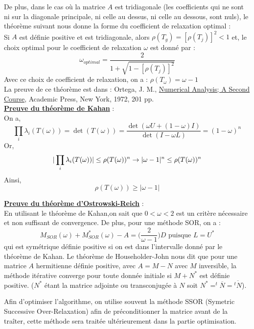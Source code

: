 De plus, dans le cas où la matrice $A$ est tridiagonale (les coefficients qui ne sont ni sur la diagonale principale, ni celle au dessus, ni celle au dessous, sont nuls), le théorème suivant nous donne la forme du coefficient de relaxation optimal :\\

Si $A$ est définie positive et est tridiagonale, alors $\rho(T_g)=[\rho(T_j)]^2<1$ et, le choix optimal pour le coefficient de relaxation $\omega$ est donné par : 
$$
\omega_{optimal}=\frac{2}{1+\sqrt{1-[\rho(T_j)]^2}}
$$
Avec ce choix de coefficient de relaxation, on a : $\rho(T_\omega)=\omega-1$\\
La preuve de ce théorème est dans : Ortega, J. M., \underline{Numerical
Analysis; A Second Course}, Academic Press, New York, 1972, 201 pp.\\

\noindent \underline{\textbf{Preuve du théorème de Kahan}} :\\
On a,
$$
\prod\limits_i \lambda_i(T(\omega))=\det(T(\omega))=\frac{\det(\omega U+(1-\omega)I)}{\det(I-\omega L)}=(1-\omega)^n 
$$
Or,
$$
|\prod\limits_i \lambda_i(T(\omega))|\leq\rho(T(\omega))^n \\
\rightarrow |\omega-1|^n\leq\rho(T(\omega))^n\\
$$
Ainsi,
$$
\rho(T(\omega))\geq|\omega-1|
$$

\noindent \underline{\textbf{Preuve du théorème d'Ostrowski-Reich}} : \\
\indent En utilisant le théorème de Kahan,on sait que  $0<\omega<2$ est un critère nécessaire et non suffisant de convergence. De plus, pour une méthode SOR, on a :
$$
M_{SOR}(\omega)+M_{SOR}^*(\omega)-A=\bigg(\frac{2}{\omega-1}\bigg)D \text{ puisque }L=U^*
$$
qui est symétrique définie positive si on est dans l'intervalle donné par le théorème de Kahan. Le théorème de Householder-John\footnotemark{} nous dit que pour une matrice $A$ hermitienne\footnotemark{} définie positive, avec $A=M-N$ avec $M$ inversible, la méthode itérative converge pour toute donnée initiale si $M+N^*$ est définie positive. ($N^*$ étant la matrice adjointe ou transconjugée à $N$ soit $N^*=^t\overline{N}=\overline{^tN}$).


Afin d'optimiser l'algorithme, on utilise souvent la méthode SSOR (Symetric Successive Over-Relaxation) afin de préconditionner la matrice avant de la traîter, cette méthode sera traitée ultérieurement dans la partie optimisation.
